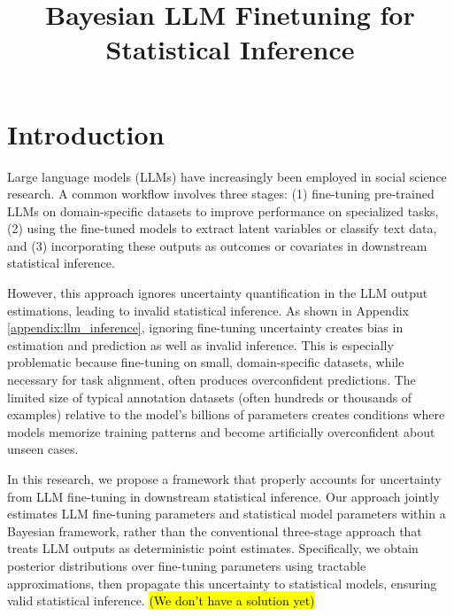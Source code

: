\documentclass[11pt]{article}
\title{Bayesian LLM Finetuning for Statistical Inference}
\author{}
\date{}
\begin{document}
\maketitle
\vspace{-1in}

\section{Introduction}

Large language models (LLMs) have increasingly been employed in social science research. A common workflow involves three stages: (1) fine-tuning pre-trained LLMs on domain-specific datasets to improve performance on specialized tasks, (2) using the fine-tuned models to extract latent variables or classify text data, and (3) incorporating these outputs as outcomes or covariates in downstream statistical inference.

However, this approach ignores uncertainty quantification in the LLM output estimations, leading to invalid statistical inference. 
As shown in Appendix \ref{appendix:llm_inference}, ignoring fine-tuning uncertainty creates bias in estimation and prediction as well as invalid inference. 
This is especially problematic because fine-tuning on small, domain-specific datasets, while necessary for task alignment, often produces overconfident predictions. 
The limited size of typical annotation datasets (often hundreds or thousands of examples) 
relative to the model's billions of parameters creates conditions where models memorize training patterns and become artificially overconfident about unseen cases.

In this research, we propose a framework that properly accounts for uncertainty from LLM fine-tuning in downstream statistical inference. Our approach jointly estimates LLM fine-tuning parameters and statistical model parameters within a Bayesian framework, rather than the conventional three-stage approach that treats LLM outputs as deterministic point estimates. Specifically, we obtain posterior distributions over fine-tuning parameters using tractable approximations, then propagate this uncertainty to statistical models, ensuring valid statistical inference. \hl{(We don't have a solution yet)}
\end{document}
